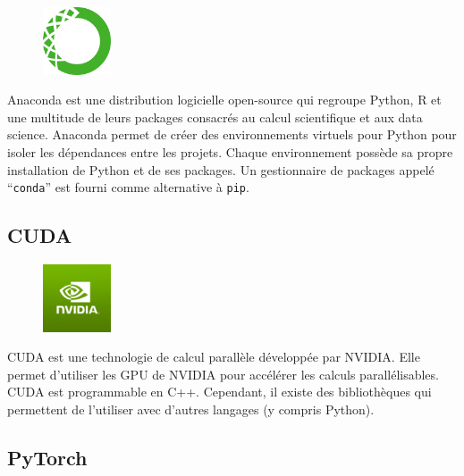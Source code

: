 \begin{figure}
    \vspace*{-\topsep}
    \begin{flushright}
        \includegraphics[width=2cm]{assets/images/anaconda.png}
    \end{flushright}
\end{figure}
Anaconda est une distribution logicielle open-source qui regroupe 
Python, R et une multitude de leurs packages consacrés au calcul scientifique et aux data science.
Anaconda permet de créer des environnements virtuels pour Python pour isoler les dépendances entre les projets.
Chaque environnement possède sa propre installation de Python et de ses packages.
Un gestionnaire de packages appelé ``\texttt{conda}'' est fourni comme alternative à \texttt{pip}.


\subsection{CUDA}
\label{subsec.cuda}

\begin{figure}
    \vspace*{-\topsep}
    \begin{flushright}
        \includegraphics[width=2cm]{assets/images/nvidia.png}
    \end{flushright}
\end{figure}
CUDA est une technologie de calcul parallèle développée par NVIDIA.
Elle permet d'utiliser les GPU de NVIDIA pour accélérer les calculs parallélisables.
CUDA est programmable en C++.
Cependant, il existe des bibliothèques qui permettent de l'utiliser avec d'autres langages (y compris Python).


\subsection{PyTorch}
\label{subsec.pytorch}

